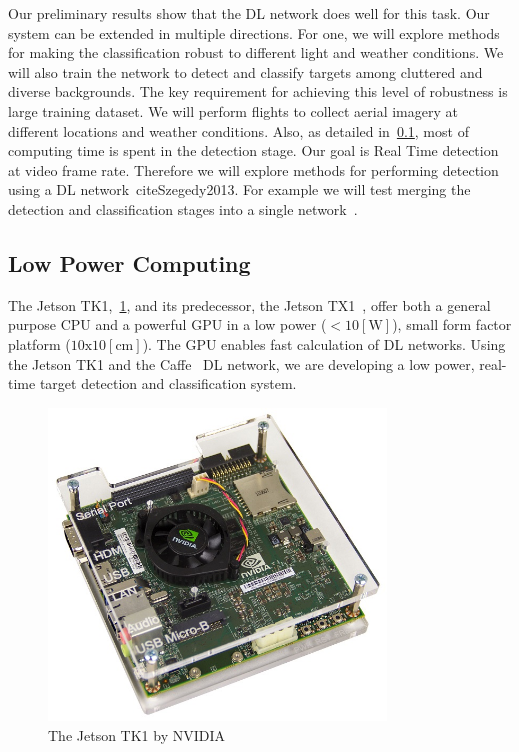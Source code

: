 \documentclass{article} %
\begin{document}
Our preliminary results show that the DL network does well for this task. Our
system can be extended in multiple directions. For one, we will explore
methods for making the classification robust to different light and weather
conditions. We will also train the network to detect and classify targets among
cluttered and diverse backgrounds. The key requirement for achieving this level
of robustness is large training dataset. We will perform flights to collect
aerial imagery at different locations and weather conditions. Also, as detailed
in~\cref{sec:low_power_computing}, most of computing time is spent in the detection
stage. Our goal is Real Time detection at video frame rate. Therefore we will
explore methods for performing detection using a DL network~cite{Szegedy2013}.
For example we will test merging the detection and classification stages into a
single network~\cite{long2014fully}.

\subsection{Low Power Computing}
\label{sec:low_power_computing}

The Jetson TK1,~\cref{fig:jetson}, and its predecessor, the Jetson
TX1~\cite{jetsontk}, offer both a general purpose CPU and a powerful GPU in a
low power ($<10[\textrm{W}]$), small form factor platform
($10\textrm{x}10[\textrm{cm}]$). The GPU enables fast calculation of DL
networks. Using the Jetson TK1 and the Caffe~\cite{jia2014caffe} DL network, we
are developing a low power, real-time target detection and classification
system.
\begin{figure}[h]
	\centering
	\includegraphics[width=0.8\textwidth]{jetson}
	\caption{The Jetson TK1 by NVIDIA}
	\label{fig:jetson}
\end{figure}
\end{document}
